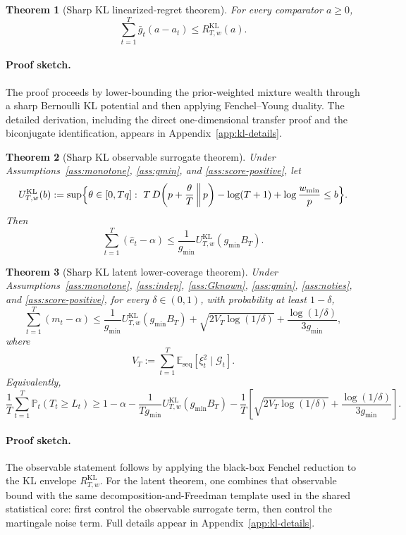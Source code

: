 \documentclass[11pt]{article}
\newtheorem{theorem}{Theorem}
\newcommand{\E}{\mathbb{E}}
\newcommand{\Prob}{\mathbb{P}}
\newcommand{\1}{\mathbf{1}}
\newcommand{\seq}{\mathrm{seq}}
\newcommand{\cG}{\mathcal{G}}
\begin{document}
\begin{theorem}[Sharp KL linearized-regret theorem]
\label{thm:kl-regret-main}
For every comparator \(a\ge 0\),
\[
\sum_{t=1}^T \bar g_t(a-a_t)
\le
R_{T,w}^{\mathrm{KL}}(a).
\]
\end{theorem}

\paragraph{Proof sketch.}
The proof proceeds by lower-bounding the prior-weighted mixture wealth through a sharp Bernoulli KL potential and then applying Fenchel--Young duality. The detailed derivation, including the direct one-dimensional transfer proof and the biconjugate identification, appears in Appendix~\ref{app:kl-details}.

\begin{theorem}[Sharp KL observable surrogate theorem]
\label{thm:kl-observable-main}
Under Assumptions~\ref{ass:monotone}, \ref{ass:gmin}, and \ref{ass:score-positive}, let
\[
U_{T,w}^{\mathrm{KL}}(b)
:=
\sup\Bigl\{
\theta\in[0,Tq]:
\ T\,D\!\left(p+\frac{\theta}{T}\,\middle\|\,p\right)-\log(T+1)+\log\frac{w_{\min}}{p}\le b
\Bigr\}.
\]
Then
\[
\sum_{t=1}^T(\hat e_t-\alpha)
\le
\frac{1}{g_{\min}}U_{T,w}^{\mathrm{KL}}(g_{\min}B_T).
\]
\end{theorem}

\begin{theorem}[Sharp KL latent lower-coverage theorem]
\label{thm:kl-latent-main}
Under Assumptions~\ref{ass:monotone}, \ref{ass:indep}, \ref{ass:Gknown}, \ref{ass:gmin}, \ref{ass:noties}, and \ref{ass:score-positive}, for every \(\delta\in(0,1)\), with probability at least \(1-\delta\),
\[
\sum_{t=1}^T (m_t-\alpha)
\le
\frac{1}{g_{\min}}U_{T,w}^{\mathrm{KL}}(g_{\min}B_T)
+
\sqrt{2V_T\log(1/\delta)}
+
\frac{\log(1/\delta)}{3g_{\min}},
\]
where
\[
V_T:=\sum_{t=1}^T \E_{\seq}[\xi_t^2\mid \cG_t].
\]
Equivalently,
\[
\frac1T\sum_{t=1}^T \Prob_t(T_t\ge L_t)
\ge
1-\alpha
-
\frac{1}{Tg_{\min}}U_{T,w}^{\mathrm{KL}}(g_{\min}B_T)
-
\frac{1}{T}\left[
\sqrt{2V_T\log(1/\delta)}
+
\frac{\log(1/\delta)}{3g_{\min}}
\right].
\]
\end{theorem}

\paragraph{Proof sketch.}
The observable statement follows by applying the black-box Fenchel reduction to the KL envelope \(R_{T,w}^{\mathrm{KL}}\). For the latent theorem, one combines that observable bound with the same decomposition-and-Freedman template used in the shared statistical core: first control the observable surrogate term, then control the martingale noise term. Full details appear in Appendix~\ref{app:kl-details}.
\end{document}

